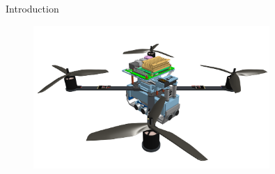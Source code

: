 
\begin{frame}{Introduction}
    \begin{figure}
        \centering
        \includegraphics[width=0.8\textwidth]{img/carcara3.png}
        \label{fig:carcara}
    \end{figure}
\end{frame}

